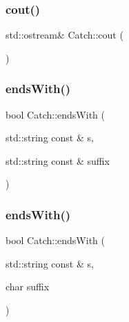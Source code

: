 \mbox{\label{namespace_catch_a50af73c5a37ad5c6558df4ce4a275e83}} 
\subsubsection{\texorpdfstring{cout()}{cout()}}
{\footnotesize\ttfamily std\+::ostream\& Catch\+::cout (\begin{DoxyParamCaption}{ }\end{DoxyParamCaption})}

\mbox{\label{namespace_catch_ada025504f627feaf9ac68ca391515dff}} 
\subsubsection{\texorpdfstring{endsWith()}{endsWith()}\hspace{0.1cm}{\footnotesize\ttfamily [1/2]}}
{\footnotesize\ttfamily bool Catch\+::ends\+With (\begin{DoxyParamCaption}\item[{std\+::string const \&}]{s,  }\item[{std\+::string const \&}]{suffix }\end{DoxyParamCaption})}

\mbox{\label{namespace_catch_afd801a3e33fd7a8b91ded0d02747a93f}} 
\subsubsection{\texorpdfstring{endsWith()}{endsWith()}\hspace{0.1cm}{\footnotesize\ttfamily [2/2]}}
{\footnotesize\ttfamily bool Catch\+::ends\+With (\begin{DoxyParamCaption}\item[{std\+::string const \&}]{s,  }\item[{char}]{suffix }\end{DoxyParamCaption})}

\mbox{\label{namespace_catch_ab5da9aa67c42a3f626aea07d0b556829}} 
